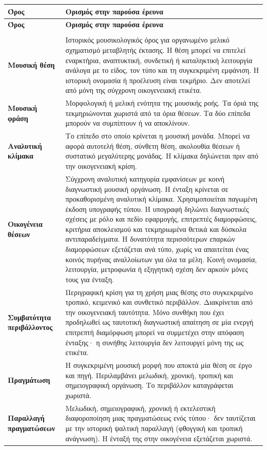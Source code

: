 \documentclass[11pt,a4paper]{article}
\begin{document}
{\small
\begin{xltabular}{\textwidth}{@{}>{\RaggedRight\arraybackslash}p{0.23\textwidth}Y@{}}
\toprule
\textbf{Όρος} & \textbf{Ορισμός στην παρούσα έρευνα}\tabularnewline
\midrule
\endfirsthead
\toprule
\textbf{Όρος} & \textbf{Ορισμός στην παρούσα έρευνα}\tabularnewline
\midrule
\endhead
\midrule
{}\tabularnewline
\endfoot
\bottomrule
\endlastfoot
\textbf{Μουσική θέση} & Ιστορικός μουσικολογικός όρος για οργανωμένο μελικό σχηματισμό μεταβλητής έκτασης. Η θέση μπορεί να επιτελεί εναρκτήρια, αναπτυκτική, συνδετική ή καταληκτική λειτουργία ανάλογα με το είδος, τον τύπο και τη συγκεκριμένη εμφάνιση. Η ιστορική ονομασία ή προέλευση είναι τεκμήριο. Δεν αποτελεί από μόνη της σύγχρονη οικογενειακή ετικέτα.\tabularnewline
\midrule
\textbf{Μουσική φράση} & Μορφολογική ή μελική ενότητα της μουσικής ροής. Τα όριά της τεκμηριώνονται χωριστά από τα όρια θέσεων. Τα δύο επίπεδα μπορούν να συμπίπτουν ή να αποκλίνουν.\tabularnewline
\midrule
\textbf{Αναλυτική κλίμακα} & Το επίπεδο στο οποίο κρίνεται η μουσική μονάδα. Μπορεί να αφορά αυτοτελή θέση, σύνθετη θέση, ακολουθία θέσεων ή συστατικό μεγαλύτερης μονάδας. Η κλίμακα δηλώνεται πριν από την οικογενειακή κρίση.\tabularnewline
\midrule
\textbf{Οικογένεια θέσεων} & Σύγχρονη αναλυτική κατηγορία εμφανίσεων με κοινή διαγνωστική μουσική οργάνωση. Η ένταξη κρίνεται σε προκαθορισμένη αναλυτική κλίμακα. Χρησιμοποιείται παγωμένη έκδοση υπογραφής τύπου. Η υπογραφή δηλώνει διαγνωστικές σχέσεις με ρόλο και πεδίο εφαρμογής, επιτρεπτές διαμορφώσεις, κριτήρια αποκλεισμού και τεκμηριωμένα θετικά και δύσκολα αντιπαραδείγματα. Η δυνατότητα περισσότερων επαρκών διαμορφώσεων εξετάζεται ανά τύπο, χωρίς να απαιτείται ένας κοινός πυρήνας αναλλοίωτων για όλα τα μέλη. Κοινή ονομασία, λειτουργία, μετροφωνία ή εξηγητική σχέση δεν αρκούν μόνες τους για ένταξη.\tabularnewline
\midrule
\textbf{Συμβατότητα περιβάλλοντος} & Περιγραφική κρίση για τη χρήση μιας θέσης στο συγκεκριμένο τροπικό, κειμενικό και συνθετικό περιβάλλον. Διακρίνεται από την οικογενειακή ταυτότητα. Μόνο συνθήκη που έχει προδηλωθεί ως ταυτοτική διαγνωστική απαίτηση σε μία ενεργή επιτρεπτή διαμόρφωση μπορεί να συμμετέχει στην απόφαση ένταξης· η συνήθης λειτουργία δεν λειτουργεί μόνη της ως ετικέτα.\tabularnewline
\midrule
\textbf{Πραγμάτωση} & Η συγκεκριμένη μουσική μορφή που αποκτά μία θέση σε έργο και πηγή. Περιλαμβάνει μελωδική, χρονική, τροπική και σημειογραφική οργάνωση. Το περιβάλλον καταγράφεται χωριστά.\tabularnewline
\midrule
\textbf{Παραλλαγή πραγματώσεων} & Μελωδική, σημειογραφική, χρονική ή εκτελεστική διαφοροποίηση μιας πραγματώσεως ενός τύπου· δεν ταυτίζεται με την ιστορική ψαλτική παραλλαγή (φθογγική και τροπική ανάγνωση). Η ένταξή της στην οικογένεια εξετάζεται χωριστά.\tabularnewline

\end{xltabular}}
\end{document}
